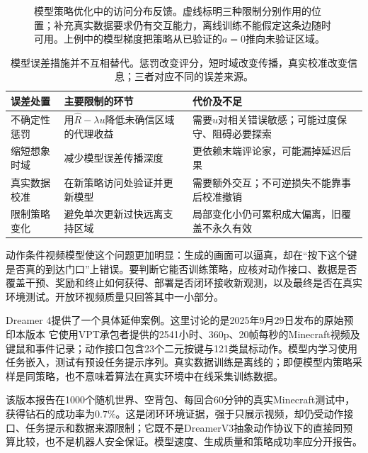 \begin{figure}[t]
  \centering
  
  \caption{模型策略优化中的访问分布反馈。虚线标明三种限制分别作用的位置；补充真实数据要求仍有交互能力，离线训练不能假定这条边随时可用。上例中的模型梯度把策略从已验证的$a=0$推向未验证区域。}
  \label{fig:rl-learning-model-feedback}
\end{figure}

\begin{table}[t]
  \centering
  \small
  \begin{tabularx}{\linewidth}{>{\raggedright\arraybackslash}p{26mm} >{\raggedright\arraybackslash}X >{\raggedright\arraybackslash}X}
    \toprule
    误差处置 & 主要限制的环节 & 代价及不足 \\
    \midrule
    不确定性惩罚 & 用$\widehat R-\lambda u$降低未确信区域的代理收益 & 需要$u$对相关错误敏感；可能过度保守、阻碍必要探索 \\
    缩短想象时域 & 减少模型误差传播深度 & 更依赖末端评论家，可能漏掉延迟后果 \\
    真实数据校准 & 在新策略访问处验证并更新模型 & 需要额外交互；不可逆损失不能靠事后校准撤销 \\
    限制策略变化 & 避免单次更新过快远离支持区域 & 局部变化小仍可累积成大偏离，旧覆盖不永久有效 \\
    \bottomrule
  \end{tabularx}
  \caption{模型误差措施并不互相替代。惩罚改变评分，短时域改变传播，真实校准改变信息；三者对应不同的误差来源。}
  \label{tab:rl-learning-model-policy-errors}
\end{table}

动作条件视频模型使这个问题更加明显：生成的画面可以逼真，却在“按下这个键是否真的到达门口”上错误。要判断它能否训练策略，应核对动作接口、数据是否覆盖干预、奖励和终止如何获得、部署是否闭环接收新观测，以及最终是否在真实环境测试。开放环视频质量只回答其中一小部分。

Dreamer 4提供了一个具体延伸案例。这里讨论的是2025年9月29日发布的原始预印本版本
它使用VPT承包者提供的2541小时、360p、20帧每秒的Minecraft视频及键鼠和事件记录；动作接口包含23个二元按键与121类鼠标动作。模型内学习使用任务嵌入，测试有预设任务提示序列。真实数据训练是离线的；即便模型内策略采样是同策略，也不意味着算法在真实环境中在线采集训练数据。

该版本报告在1000个随机世界、空背包、每回合60分钟的真实Minecraft测试中，获得钻石的成功率为$0.7\%$。这是闭环环境证据，强于只展示视频，却仍受动作接口、任务提示和数据来源限制；它既不是DreamerV3抽象动作协议下的直接同预算比较，也不是机器人安全保证。模型速度、生成质量和策略成功率应分开报告。

